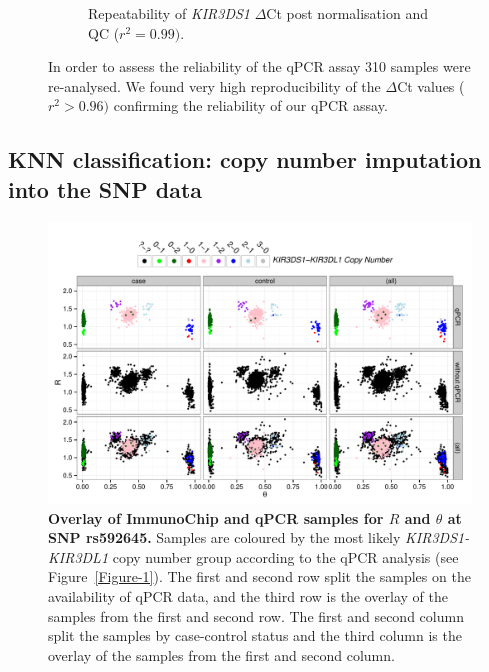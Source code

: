\begin{figure}[h]
\begin{subfigure}[b]{.4\textwidth}
        \caption{Repeatability of \emph{KIR3DS1} $\Delta$Ct post normalisation and QC ($r^{2}=0.99)$.}
        \label{}
    \end{subfigure}
    \caption{
        \label{Figure-S3}
        In order to assess the reliability of the qPCR assay 310 samples were re-analysed.
        We found very high reproducibility of the $\Delta$Ct values ($r^{2} > 0.96)$ confirming the reliability of our qPCR assay.
    }
\end{figure} 




\subsection{KNN classification: copy number imputation into the SNP data}

\begin{figure}[h!]
  \centering
  \includegraphics[scale=.5]{KIR/figures/Figure-2.pdf}
  \caption{ \label{Figure-2}
  \textbf{Overlay of ImmunoChip and qPCR samples for $R$ and $\theta$ at SNP rs592645.}
  Samples are coloured by the most likely \emph{KIR3DS1-KIR3DL1} copy number
  group according to the qPCR analysis (see Figure~\ref{Figure-1}).  The
  first and second row split the samples on the availability of qPCR data, and
  the third row is the overlay of the samples from the first and second row.
  The first and second column split the samples by case-control status and the
  third column is the overlay of the samples from the first and second column.}
\end{figure}

